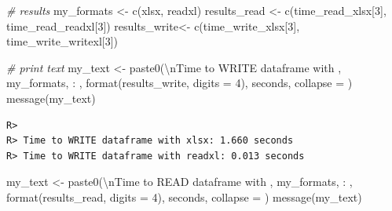 \documentclass[
  12pt,
]{book}
\newenvironment{Shaded}{\begin{snugshade}}{\end{snugshade}}
\newcommand{\AttributeTok}[1]{\textcolor[rgb]{0.61,0.61,0.61}{#1}}
\newcommand{\CommentTok}[1]{\textcolor[rgb]{0.37,0.37,0.37}{\textit{#1}}}
\newcommand{\DecValTok}[1]{\textcolor[rgb]{0.06,0.06,0.06}{#1}}
\newcommand{\FunctionTok}[1]{\textcolor[rgb]{0,0,0}{#1}}
\newcommand{\NormalTok}[1]{#1}
\newcommand{\OtherTok}[1]{\textcolor[rgb]{0.37,0.37,0.37}{#1}}
\newcommand{\SpecialCharTok}[1]{\textcolor[rgb]{0,0,0}{#1}}
\newcommand{\StringTok}[1]{\textcolor[rgb]{0.5,0.5,0.5}{#1}}
\begin{document}
\begin{Shaded}
\begin{Highlighting}[]
\CommentTok{\# results}
\NormalTok{my\_formats }\OtherTok{\textless{}{-}} \FunctionTok{c}\NormalTok{(}\StringTok{\textquotesingle{}xlsx\textquotesingle{}}\NormalTok{, }\StringTok{\textquotesingle{}readxl\textquotesingle{}}\NormalTok{)}
\NormalTok{results\_read }\OtherTok{\textless{}{-}} \FunctionTok{c}\NormalTok{(time\_read\_xlsx[}\DecValTok{3}\NormalTok{], time\_read\_readxl[}\DecValTok{3}\NormalTok{])}
\NormalTok{results\_write}\OtherTok{\textless{}{-}} \FunctionTok{c}\NormalTok{(time\_write\_xlsx[}\DecValTok{3}\NormalTok{], time\_write\_writexl[}\DecValTok{3}\NormalTok{])}

\CommentTok{\# print text}
\NormalTok{my\_text }\OtherTok{\textless{}{-}} \FunctionTok{paste0}\NormalTok{(}\StringTok{\textquotesingle{}}\SpecialCharTok{\textbackslash{}n}\StringTok{Time to WRITE dataframe with \textquotesingle{}}\NormalTok{,}
\NormalTok{                  my\_formats, }\StringTok{\textquotesingle{}: \textquotesingle{}}\NormalTok{,}
                  \FunctionTok{format}\NormalTok{(results\_write, }\AttributeTok{digits =} \DecValTok{4}\NormalTok{),}
                  \StringTok{\textquotesingle{} seconds\textquotesingle{}}\NormalTok{, }\AttributeTok{collapse =} \StringTok{\textquotesingle{}\textquotesingle{}}\NormalTok{)}
\FunctionTok{message}\NormalTok{(my\_text)}
\end{Highlighting}
\end{Shaded}

\begin{verbatim}
R> 
R> Time to WRITE dataframe with xlsx: 1.660 seconds
R> Time to WRITE dataframe with readxl: 0.013 seconds
\end{verbatim}

\begin{Shaded}
\begin{Highlighting}[]
\NormalTok{my\_text }\OtherTok{\textless{}{-}} \FunctionTok{paste0}\NormalTok{(}\StringTok{\textquotesingle{}}\SpecialCharTok{\textbackslash{}n}\StringTok{Time to READ dataframe with \textquotesingle{}}\NormalTok{,}
\NormalTok{                  my\_formats, }\StringTok{\textquotesingle{}: \textquotesingle{}}\NormalTok{,}
                  \FunctionTok{format}\NormalTok{(results\_read, }\AttributeTok{digits =} \DecValTok{4}\NormalTok{),}
                  \StringTok{\textquotesingle{} seconds\textquotesingle{}}\NormalTok{, }\AttributeTok{collapse =} \StringTok{\textquotesingle{}\textquotesingle{}}\NormalTok{)}
\FunctionTok{message}\NormalTok{(my\_text)}
\end{Highlighting}
\end{Shaded}
\end{document}
